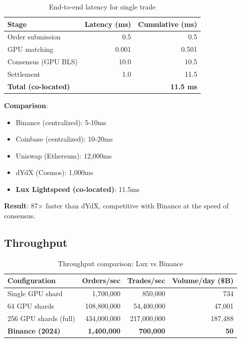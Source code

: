 \documentclass[11pt,letterpaper]{article}
\begin{document}
\begin{table}[h]
\centering
\begin{tabular}{lrr}
\toprule
\textbf{Stage} & \textbf{Latency (ms)} & \textbf{Cumulative (ms)} \\
\midrule
Order submission & 0.5 & 0.5 \\
GPU matching & 0.001 & 0.501 \\
Consensus (GPU BLS) & 10.0 & 10.5 \\
Settlement & 1.0 & 11.5 \\
\midrule
\textbf{Total (co-located)} & & \textbf{11.5 ms} \\
\bottomrule
\end{tabular}
\caption{End-to-end latency for single trade}
\end{table}

\textbf{Comparison}:
\begin{itemize}
    \item Binance (centralized): 5-10ms
    \item Coinbase (centralized): 10-20ms
    \item Uniswap (Ethereum): 12,000ms
    \item dYdX (Cosmos): 1,000ms
    \item \textbf{Lux Lightspeed (co-located)}: 11.5ms
\end{itemize}

\textbf{Result}: 87$\times$ faster than dYdX, competitive with Binance at the speed of consensus.

\subsection{Throughput}

\begin{table}[h]
\centering
\begin{tabular}{lrrr}
\toprule
\textbf{Configuration} & \textbf{Orders/sec} & \textbf{Trades/sec} & \textbf{Volume/day (\$B)} \\
\midrule
Single GPU shard & 1,700,000 & 850,000 & 734 \\
64 GPU shards & 108,800,000 & 54,400,000 & 47,001 \\
256 GPU shards (full) & 434,000,000 & 217,000,000 & 187,488 \\
\midrule
\textbf{Binance (2024)} & \textbf{1,400,000} & \textbf{700,000} & \textbf{50} \\
\bottomrule
\end{tabular}
\caption{Throughput comparison: Lux vs Binance}
\end{table}
\end{document}
